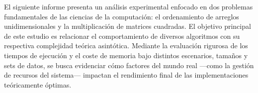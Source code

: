 El siguiente informe presenta un análisis experimental enfocado en dos problemas fundamentales de las ciencias de la computación: el ordenamiento de arreglos unidimensionales y la multiplicación de matrices cuadradas. El objetivo principal de este estudio es relacionar el comportamiento de diversos algoritmos con su respectiva complejidad teórica asintótica. Mediante la evaluación rigurosa de los tiempos de ejecución y el coste de memoria bajo distintos escenarios, tamaños y sets de datos, se busca evidenciar cómo factores del mundo real —como la gestión de recursos del sistema— impactan el rendimiento final de las implementaciones teóricamente óptimas.